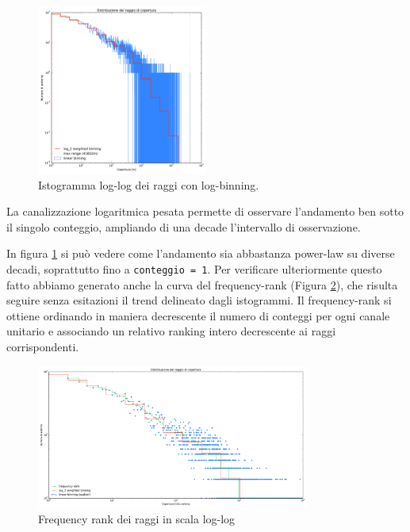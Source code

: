 \begin{figure}[b!]
	\centering
	\includegraphics[width=0.5\textwidth]{./Immagini/Dati/logbin}
	\caption{Istogramma log-log dei raggi con log-binning.}
	\label{fig:lograggi}
\end{figure}

La canalizzazione logaritmica pesata permette di osservare l'andamento ben sotto il singolo conteggio, ampliando di una decade l'intervallo di osservazione.

In figura \ref{fig:lograggi} si può vedere come l'andamento sia abbastanza power-law su diverse decadi, soprattutto fino a \lstinline{conteggio = 1}. Per verificare ulteriormente questo fatto abbiamo generato anche la curva del frequency-rank (Figura \ref{fig:rfreqrank}), che risulta seguire senza esitazioni il trend delineato dagli istogrammi.
Il frequency-rank si ottiene ordinando in maniera decrescente il numero di conteggi per ogni canale unitario e associando un relativo ranking intero decrescente ai raggi corrispondenti. 

\begin{figure}[t]
	\centering
	\includegraphics[width=0.8\textwidth]{./Immagini/Dati/rangefreqrank}
	\caption{Frequency rank dei raggi in scala log-log}
	\label{fig:rfreqrank}
\end{figure}


